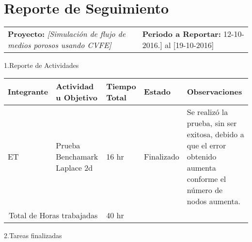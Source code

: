 \documentclass[12pt]{report}
\numberwithin{equation}{section}
\begin{document}
\newpage

\centering \section{Reporte de Seguimiento} 


\begin{tabular}{m{7cm} m{8cm}}
\small{ \textbf{Proyecto:} \scriptsize{\textit{[Simulaci\'on de flujo de medios porosos usando CVFE]}}} & \small{\textbf{Periodo a Reportar:} \scriptsize{12-10-2016.] al [19-10-2016]}}
\end{tabular}

\begin{flushleft}

\large{1.Reporte de Actividades }\\


\begin{table}[H]
\begin{tabular}{|m{2cm}|m{4.5cm}|m{1.5cm}|m{1.5cm}|m{4.5cm}|}
\hline
\small{\textbf{Integrante}} &\small{ \textbf{Actividad u Objetivo}} &\small{ \textbf{Tiempo Total}} & \small{\textbf{Estado} }& \small{\textbf{Observaciones}}\\
\hline \hline
ET & Prueba Benchamark Laplace 2d & 16 hr & Finalizado & \small{Se realiz\'o la prueba, sin ser exitosa, debido a que el error obtenido aumenta conforme el n\'umero de nodos aumenta.}\\
\hline
\multicolumn{2}{|c|}{Total de Horas trabajadas} & 40 hr  & & \\
\hline 
\end{tabular}
\label{tabla: TABLA CE Actividades}
\end{table}



\large{2.Tareas finalizadas }\\


\end{flushleft}
\end{document}
